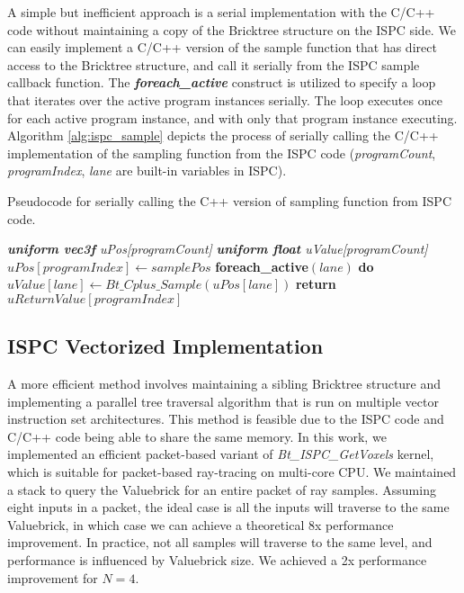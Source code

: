 A simple but inefficient approach is a serial implementation with the C/C++ code without
maintaining a copy of the Bricktree structure on the ISPC side. We can easily 
implement a C/C++ version of the sample function  that has direct
access to the Bricktree structure, and call it serially from the ISPC sample callback
function. The \textbf{\textit{foreach\_active}} construct is
utilized to specify a loop that iterates over the active program instances serially.
The loop executes once for each active program instance, and with only that program
instance executing. Algorithm \ref{alg:ispc_sample} depicts the process of serially calling 
the C/C++ implementation of the sampling function from the ISPC code (\textit{programCount},
\textit{programIndex}, \textit{lane} are built-in variables in ISPC). 

\begin{algorithm}
	\caption{Pseudocode for serially calling the C++ version of sampling function from ISPC code. }\label{alg:ispc_sample}
	\begin{algorithmic}[1]
        	\State \textit{\textbf{uniform vec3f} uPos[programCount]}
            \State \textit{\textbf{uniform float} uValue[programCount]}
            \State $uPos[programIndex] \gets samplePos$
            \State \textbf{foreach\_active}$(lane)$ \textbf{do}
            	\State \ \ \ \ $uValue[lane] \gets Bt\_Cplus\_Sample(uPos[lane])$
            \State \textbf{return} $uReturnValue[programIndex]$           
    	\EndProcedure
	\end{algorithmic}
\end{algorithm}
\vspace{-1em}


\subsection{ISPC Vectorized Implementation}
A more efficient method involves maintaining a sibling Bricktree structure and 
implementing a parallel tree traversal algorithm that is run on multiple vector
instruction set architectures.
This method is feasible due to the ISPC code and C/C++ code being able to share the same memory.
In this work, we implemented an efficient packet-based variant of 
\textit{Bt\_ISPC\_GetVoxels} kernel, which is suitable for packet-based ray-tracing
on multi-core CPU. We maintained a stack to query the Valuebrick for an entire
packet of ray samples. Assuming eight inputs in a packet, the ideal case is all the inputs will
traverse to the same Valuebrick, in which case we can achieve a theoretical 8x performance
improvement. In practice, not all samples will traverse to the same level,
and performance is influenced by Valuebrick size. We achieved a 2x performance
improvement for $N=4$.


